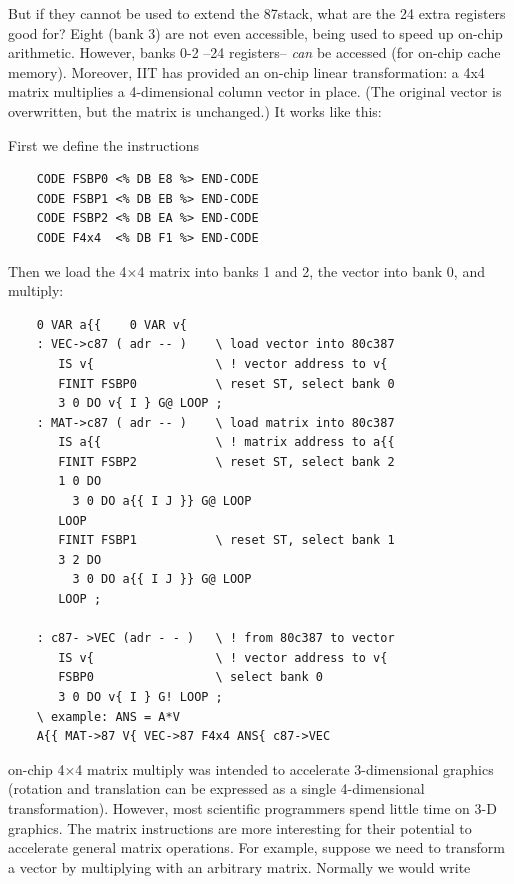 But if they cannot be used to extend the 87stack, what are the 24 extra registers good for? Eight (bank 3) are not even accessible, being used to speed up on-chip arithmetic. However, banks 0-2 --24 registers-- \textit{can} be accessed (\eg for on-chip cache memory). Moreover, IIT has provided an on-chip linear transformation: a 4x4 matrix multiplies a 4-dimensional column vector in place. (The original vector is overwritten, but the matrix is unchanged.) It works like this:

First we define the instructions

\begin{lstlisting}
    CODE FSBP0 <% DB E8 %> END-CODE
    CODE FSBP1 <% DB EB %> END-CODE
    CODE FSBP2 <% DB EA %> END-CODE
    CODE F4x4  <% DB F1 %> END-CODE
\end{lstlisting}

Then we load the 4$\times$4 matrix into banks 1 and 2, the vector into bank 0, and multiply:

\begin{lstlisting}
    0 VAR a{{    0 VAR v{
    : VEC->c87 ( adr -- )    \ load vector into 80c387
       IS v{                 \ ! vector address to v{
       FINIT FSBP0           \ reset ST, select bank 0
       3 0 DO v{ I } G@ LOOP ;
    : MAT->c87 ( adr -- )    \ load matrix into 80c387
       IS a{{                \ ! matrix address to a{{
       FINIT FSBP2           \ reset ST, select bank 2
       1 0 DO
         3 0 DO a{{ I J }} G@ LOOP
       LOOP
       FINIT FSBP1           \ reset ST, select bank 1
       3 2 DO
         3 0 DO a{{ I J }} G@ LOOP
       LOOP ;
       
    : c87- >VEC (adr - - )   \ ! from 80c387 to vector
       IS v{                 \ ! vector address to v{
       FSBP0                 \ select bank 0
       3 0 DO v{ I } G! LOOP ;
    \ example: ANS = A*V
    A{{ MAT->87 V{ VEC->87 F4x4 ANS{ c87->VEC
\end{lstlisting}
 

 on-chip 4$\times$4 matrix multiply was intended to accelerate 3-dimensional graphics (rotation and translation can be expressed as a single 4-dimensional transformation). However, most scientific programmers spend little time on 3-D graphics. The matrix instructions are more interesting for their potential to accelerate general matrix operations. For example, suppose we need to transform a vector by multiplying with an arbitrary matrix. Normally we would write

